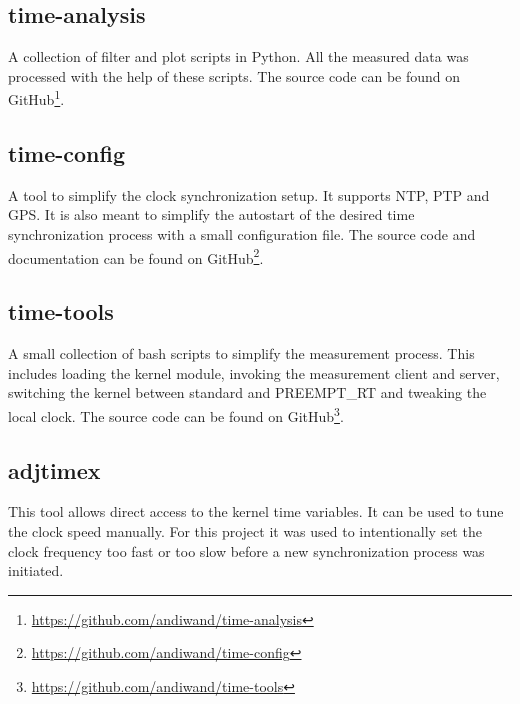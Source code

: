 \subsection{time-analysis}

A collection of filter and plot scripts in Python. All the measured data was processed with the help of these scripts. The source code can be found on GitHub\footnote{\url{https://github.com/andiwand/time-analysis}}.

\subsection{time-config}

A tool to simplify the clock synchronization setup. It supports NTP, PTP and GPS. It is also meant to simplify the autostart of the desired time synchronization process with a small configuration file. The source code and documentation can be found on GitHub\footnote{\url{https://github.com/andiwand/time-config}}.

\subsection{time-tools}

A small collection of bash scripts to simplify the measurement process. This includes loading the kernel module, invoking the measurement client and server, switching the kernel between standard and PREEMPT\_RT and tweaking the local clock. The source code can be found on GitHub\footnote{\url{https://github.com/andiwand/time-tools}}.

\subsection{adjtimex}

This tool allows direct access to the kernel time variables. It can be used to tune the clock speed manually. For this project it was used to intentionally set the clock frequency too fast or too slow before a new synchronization process was initiated.

